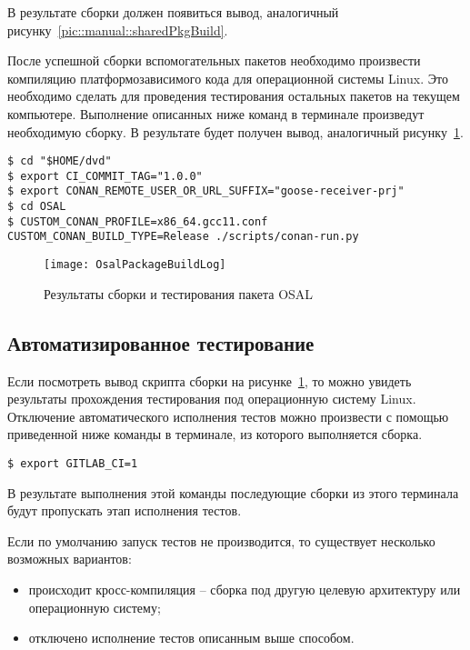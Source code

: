 В результате сборки должен появиться вывод, аналогичный
рисунку~\ref{pic::manual::sharedPkgBuild}.

После успешной сборки вспомогательных пакетов необходимо произвести компиляцию
платформозависимого кода для операционной системы Linux. Это необходимо
сделать для проведения тестирования остальных пакетов на текущем компьютере.
Выполнение описанных ниже команд в терминале произведут необходимую сборку.
В результате будет получен вывод, аналогичный
рисунку~\ref{pic::manual::osalPkgBuild}.

\begin{lstlisting}
$ cd "$HOME/dvd"
$ export CI_COMMIT_TAG="1.0.0"
$ export CONAN_REMOTE_USER_OR_URL_SUFFIX="goose-receiver-prj"
$ cd OSAL
$ CUSTOM_CONAN_PROFILE=x86_64.gcc11.conf CUSTOM_CONAN_BUILD_TYPE=Release ./scripts/conan-run.py
\end{lstlisting}

\fixTableSectionSpace

\begin{figure}[ht]
    \centering
    \texttt{[image: OsalPackageBuildLog]}
    \caption{Результаты сборки и тестирования пакета OSAL}
    \label{pic::manual::osalPkgBuild}
\end{figure}

\fixTableSectionSpace

\subsection{Автоматизированное тестирование}

Если посмотреть вывод скрипта сборки на рисунке~\ref{pic::manual::osalPkgBuild},
то можно увидеть результаты прохождения
тестирования под операционную систему Linux.
Отключение автоматического исполнения тестов можно произвести с помощью приведенной ниже
команды в терминале, из которого выполняется сборка.

\begin{lstlisting}
$ export GITLAB_CI=1
\end{lstlisting}

В результате выполнения этой команды последующие сборки из этого терминала
будут пропускать этап исполнения тестов.

Если по умолчанию запуск тестов не производится, то существует несколько
возможных вариантов:
\begin{itemize}
    \item происходит кросс-компиляция -- сборка под другую целевую архитектуру или операционную систему;
    \item отключено исполнение тестов описанным выше способом.
\end{itemize}

